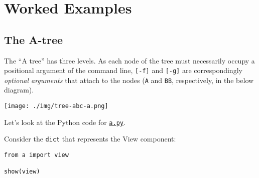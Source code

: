 \documentclass[10pt]{amsart}
\numberwithin{equation}{section}
\begin{document}
\newpage
\section{Worked Examples}
\label{sec:org8e2d228}
\subsection{The A-tree}
\label{sec:orged7ef6e}
The ``A tree'' has three levels. As each node of the tree must
necessarily occupy a positional argument of the command line,
\texttt{[-f]} and \texttt{[-g]} are correspondingly \emph{optional arguments} that attach to the nodes 
(\texttt{A} and \texttt{BB}, respectively, in the below diagram). 
\begin{center}
\texttt{[image: ./img/tree-abc-a.png]}
\end{center}

Let's look at the Python code for \href{https://github.com/tharte/parsearg/blob/master/parsearg/examples/a.py}{\texttt{a.py}}.

Consider the \texttt{dict} that represents the View component:
\begin{verbatim}
from a import view

show(view)
\end{verbatim}
\end{document}
